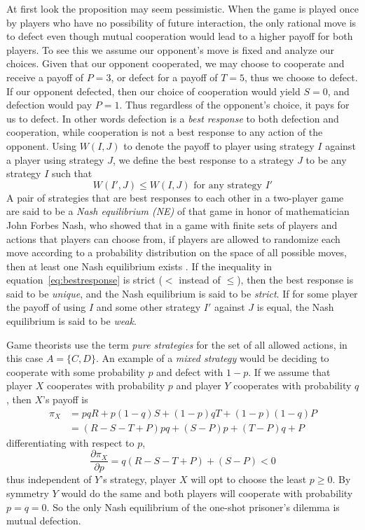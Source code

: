 At first look the proposition may seem pessimistic. When the game is played once by players who have no possibility of future interaction, the only rational move is to defect even though mutual cooperation would lead to a higher payoff for both players. To see this we assume our opponent's move is fixed and analyze our choices. Given that our opponent cooperated, we may choose to cooperate and receive a payoff of $P = 3$, or defect for a payoff of $T = 5$, thus we choose to defect. If our opponent defected, then our choice of cooperation would yield $S = 0$, and defection would pay $P = 1$. Thus regardless of the opponent's choice, it pays for us to defect. In other words defection is a \textit{best response} to both defection and cooperation, while cooperation is not a best response to any action of the opponent. Using $W(I, J)$ to denote the payoff to player using strategy $I$ against a player using strategy $J$, we define the best response to a strategy $J$ to be any strategy $I$ such that
\begin{equation}\label{eq:bestresponse}
W(I', J) \leq W(I, J) \textrm{ for any strategy }I'
\end{equation}
A pair of strategies that are best responses to each other in a two-player game are said to be a \textit{Nash equilibrium (NE)} of that game in honor of mathematician John Forbes Nash, who showed that in a game with finite sets of players and actions that players can choose from, if players are allowed to randomize each move according to a probability distribution on the space of all possible moves, then at least one Nash equilibrium exists \cite{Nash1951}. If the inequality in equation~\ref{eq:bestresponse} is strict ($<$ instead of $\leq$), then the best response is said to be \textit{unique}, and the Nash equilibrium is said to be \textit{strict}. If for some player the payoff of using $I$ and some other strategy $I'$ against $J$ is equal, the Nash equilibrium is said to be \textit{weak}.

Game theorists use the term \textit{pure strategies} for the set of all allowed actions, in this case $A = \{C, D\}$. An example of a \textit{mixed strategy} would be deciding to cooperate with some probability $p$ and defect with $1-p$. If we assume that player $X$ cooperates with probability $p$ and player $Y$ cooperates with probability $q$, then $X$'s payoff is
\begin{align*}
\pi_X &= pqR + p(1-q)S + (1-p)qT + (1-p)(1-q)P \\
&= (R - S - T + P)pq + (S - P)p + (T-P)q + P
\end{align*}
differentiating with respect to $p$,
\[
\frac{\partial \pi_X}{\partial p} = q(R - S - T + P) + (S-P) < 0
\]
thus independent of $Y$'s strategy, player $X$ will opt to choose the least $p \geq 0$. By symmetry $Y$ would do the same and both players will cooperate with probability $p = q = 0$. So the only Nash equilibrium of the one-shot prisoner's dilemma is mutual defection.

